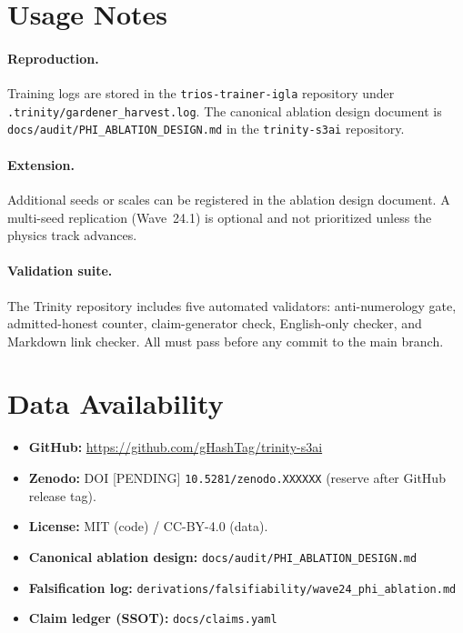 \documentclass[11pt,a4paper]{article}
\begin{document}
\section{Usage Notes}

\paragraph{Reproduction.}  Training logs are stored in the
\texttt{trios-trainer-igla} repository under
\texttt{.trinity/gardener\_harvest.log}.  The canonical ablation design
document is \texttt{docs/audit/PHI\_ABLATION\_DESIGN.md} in the
\texttt{trinity-s3ai} repository.

\paragraph{Extension.}  Additional seeds or scales can be registered in
the ablation design document.  A multi-seed replication (Wave~24.1) is
optional and not prioritized unless the physics track advances.

\paragraph{Validation suite.}  The Trinity repository includes five
automated validators: anti-numerology gate, admitted-honest counter,
claim-generator check, English-only checker, and Markdown link checker.
All must pass before any commit to the main branch.

\section{Data Availability}

\begin{itemize}
  \item \textbf{GitHub:} \url{https://github.com/gHashTag/trinity-s3ai}
  \item \textbf{Zenodo:} DOI [PENDING] \texttt{10.5281/zenodo.XXXXXX}
    (reserve after GitHub release tag).
  \item \textbf{License:} MIT (code) / CC-BY-4.0 (data).
  \item \textbf{Canonical ablation design:}
    \texttt{docs/audit/PHI\_ABLATION\_DESIGN.md}
  \item \textbf{Falsification log:}
    \texttt{derivations/falsifiability/wave24\_phi\_ablation.md}
  \item \textbf{Claim ledger (SSOT):} \texttt{docs/claims.yaml}
\end{itemize}
\end{document}
